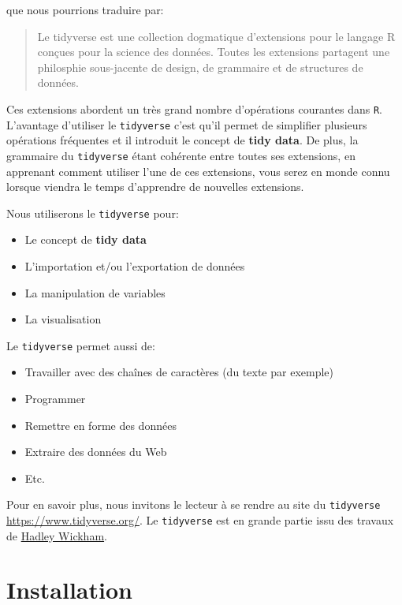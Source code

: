 \documentclass[]{book}
\providecommand{\tightlist}{%
  \setlength{\itemsep}{0pt}\setlength{\parskip}{0pt}}
\theoremstyle{definition}
\theoremstyle{definition}
\theoremstyle{definition}
\theoremstyle{remark}
\begin{document}
que nous pourrions traduire par:

\begin{quote}
Le tidyverse est une collection dogmatique d'extensions pour le langage
R conçues pour la science des données. Toutes les extensions partagent
une philosphie sous-jacente de design, de grammaire et de structures de
données.
\end{quote}

Ces extensions abordent un très grand nombre d'opérations courantes dans
\texttt{R}. L'avantage d'utiliser le \texttt{tidyverse} c'est qu'il
permet de simplifier plusieurs opérations fréquentes et il introduit le
concept de \textbf{tidy data}. De plus, la grammaire du
\texttt{tidyverse} étant cohérente entre toutes ses extensions, en
apprenant comment utiliser l'une de ces extensions, vous serez en monde
connu lorsque viendra le temps d'apprendre de nouvelles extensions.

Nous utiliserons le \texttt{tidyverse} pour:

\begin{itemize}
\tightlist
\item
  Le concept de \textbf{tidy data}
\item
  L'importation et/ou l'exportation de données
\item
  La manipulation de variables
\item
  La visualisation
\end{itemize}

Le \texttt{tidyverse} permet aussi de:

\begin{itemize}
\tightlist
\item
  Travailler avec des chaînes de caractères (du texte par exemple)
\item
  Programmer
\item
  Remettre en forme des données
\item
  Extraire des données du Web
\item
  Etc.
\end{itemize}

Pour en savoir plus, nous invitons le lecteur à se rendre au site du
\texttt{tidyverse} \url{https://www.tidyverse.org/}. Le
\texttt{tidyverse} est en grande partie issu des travaux de
\href{http://hadley.nz/}{Hadley Wickham}.

\hypertarget{installation}{%
\section{Installation}\label{installation}}
\end{document}
